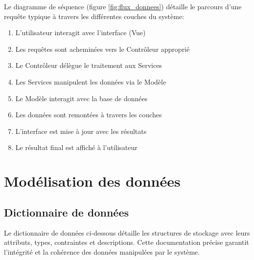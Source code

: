 Le diagramme de séquence (figure \ref{fig:flux_donnees}) détaille le parcours d'une requête typique à travers les différentes couches du système:

\begin{enumerate}
    \item L'utilisateur interagit avec l'interface (Vue)
    \item Les requêtes sont acheminées vers le Contrôleur approprié
    \item Le Contrôleur délègue le traitement aux Services
    \item Les Services manipulent les données via le Modèle
    \item Le Modèle interagit avec la base de données
    \item Les données sont remontées à travers les couches
    \item L'interface est mise à jour avec les résultats
    \item Le résultat final est affiché à l'utilisateur
\end{enumerate}


\section{Modélisation des données}

\subsection{Dictionnaire de données}
Le dictionnaire de données ci-dessous détaille les structures de stockage avec leurs attributs, 
types, contraintes et descriptions. Cette documentation précise garantit l'intégrité et 
la cohérence des données manipulées par le système.

\renewcommand{\arraystretch}{1.3} %

